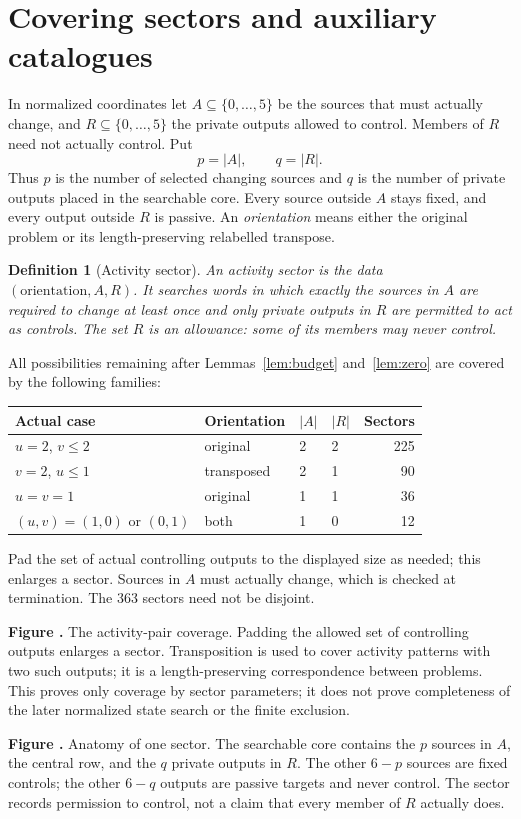 \documentclass[11pt]{article}
\newtheorem{definition}[theorem]{Definition}
\newcommand{\prooffigure}[3]{%
  \begin{center}
  \begin{minipage}{.98\linewidth}
  \centering
  \resizebox{\linewidth}{!}{}\par
  \refstepcounter{figure}\label{#2}%
  \small\textbf{Figure \thefigure.} #3
  \end{minipage}
  \end{center}}
\begin{document}
\section{Covering sectors and auxiliary catalogues}
In normalized coordinates let $A\subseteq\{0,\ldots,5\}$ be the
sources that must actually change, and $R\subseteq\{0,\ldots,5\}$
the private outputs allowed to control. Members of $R$ need not actually
control. Put
\[
p=|A|,\qquad q=|R|.
\]
Thus $p$ is the number of selected changing sources and $q$ is the number of
private outputs placed in the searchable core. Every source outside $A$
stays fixed, and every output outside $R$ is passive. An \emph{orientation}
means either the original problem or its length-preserving relabelled
transpose.
\begin{definition}[Activity sector]
An activity sector is the data $(\text{orientation},A,R)$. It searches words
in which exactly the sources in $A$ are required to change at least once and
only private outputs in $R$ are permitted to act as controls. The set $R$ is
an allowance: some of its members may never control.
\end{definition}
All possibilities remaining after Lemmas~\ref{lem:budget}
and~\ref{lem:zero} are covered by the following families:
\begin{center}\begin{tabular}{llllr}\toprule
Actual case&Orientation&$|A|$&$|R|$&Sectors\\\midrule
$u=2$, $v\le2$&original&2&2&225\\
$v=2$, $u\le1$&transposed&2&1&90\\
$u=v=1$&original&1&1&36\\
$(u,v)=(1,0)$ or $(0,1)$&both&1&0&12\\\bottomrule
\end{tabular}\end{center}
Pad the set of actual controlling outputs to the displayed size as needed;
this enlarges a sector. Sources in $A$ must actually change, which is
checked at termination. The 363 sectors need not be disjoint.
\prooffigure{sector_cover}{fig:sectors}{The activity-pair coverage.
Padding the allowed set of controlling outputs enlarges a sector.
Transposition is used to cover activity patterns with two such outputs;
it is a length-preserving correspondence between problems. This proves only
coverage by sector parameters; it does not prove completeness of the later
normalized state search or the finite exclusion.}
\prooffigure{sector_anatomy}{fig:sector-anatomy}{Anatomy of one sector.
The searchable core contains the $p$ sources in $A$, the central row, and the
$q$ private outputs in $R$. The other $6-p$ sources are fixed controls; the
other $6-q$ outputs are passive targets and never control. The sector records
permission to control, not a claim that every member of $R$ actually does.}
\end{document}
